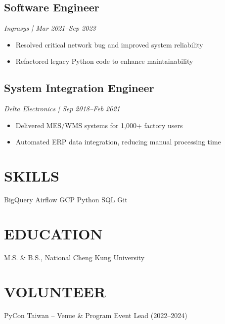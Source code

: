 \documentclass[a4paper,10pt]{article}
\begin{document}
\subsection*{Software Engineer}
\textit{\color{gray}Ingrasys | Mar 2021–Sep 2023}
\begin{itemize}
    \item Resolved critical network bug and improved system reliability
    \item Refactored legacy Python code to enhance maintainability
\end{itemize}

\subsection*{System Integration Engineer}
\textit{\color{gray}Delta Electronics | Sep 2018–Feb 2021}
\begin{itemize}
    \item Delivered MES/WMS systems for 1,000+ factory users
    \item Automated ERP data integration, reducing manual processing time
\end{itemize}

\section*{SKILLS}
BigQuery \quad Airflow \quad GCP \quad Python \quad SQL \quad Git

\section*{EDUCATION}
M.S. \& B.S., National Cheng Kung University

\section*{VOLUNTEER}
PyCon Taiwan – Venue \& Program Event Lead (2022–2024)
\end{document}

